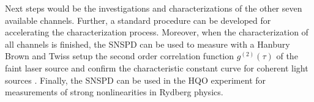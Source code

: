 Next steps would be the investigations and characterizations of the other seven available channels.
Further, a standard procedure can be developed for accelerating the characterization process.
Moreover, when the characterization of all channels is finished, the SNSPD can be used to measure with a Hanbury Brown and
Twiss setup the second order correlation function $g^{(2)}(\tau)$ of the faint laser source and confirm
the characteristic constant curve for coherent light sources \cite{glauber-1963}.
Finally, the SNSPD can be used in the HQO experiment for measurements of strong nonlinearities in Rydberg physics.

